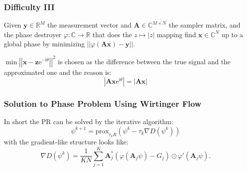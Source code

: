 \begin{frame}
    \frametitle{Difficulty III}
    \begin{Pro}
        Given $\boldsymbol{y} \in \mathbb{R}^M$ the measurement vector and $\boldsymbol{A} \in \mathbb{C}^{M \times N}$ the sampler matrix, 
        and the phase destroyer $\varphi \colon \mathbb{C} \to \mathbb{R}$ that does the
         $z \mapsto \left|z\right|$ mapping find $\boldsymbol{x} \in \mathbb{C}^N$ up to a global phase 
        by minimizing $ \left|\left|\varphi(\boldsymbol{A}\boldsymbol{x})-\boldsymbol{y}\right|\right|$.
      \end{Pro}
    \pause
    \begin{Rem} 
        $\min \left|\left|\boldsymbol{x}-\boldsymbol{z}\mathrm{e}^{-\mathrm{i}\theta}\right|\right|^2$ is chosen as the difference between the 
        true signal and the approximated one and the reason is:
        \begin{equation}
          \left|\boldsymbol{A}\boldsymbol{x}\mathrm{e}^{\mathrm{i}\theta}\right| = \left|\boldsymbol{A}\boldsymbol{x}\right|
        \end{equation}
      \end{Rem}

\end{frame}



\begin{frame}
    \frametitle{Solution to Phase Problem Using Wirtinger Flow}
    \pause
    In short the \acl*{PR} can be solved by the iterative algorithm:
    \pause
      \begin{equation}\label{eq:pr_solution}
        \psi^{k+1} = \text{prox}_{\tau_{k}R}(\psi^k-\tau_k\nabla{D(\psi^k)})
      \end{equation}
\pause
      with the gradient-like structure looks like: 
      \begin{equation}\label{eq:gradient_pr_solution}
        \nabla{D(\psi^k)} = \frac{1}{KN} \sum_{j=1}^{K} \boldsymbol{A}_j^*\left(\varphi\left(\boldsymbol{A}_j\psi\right)-G_j\right)\odot \varphi'(\boldsymbol{A}_j\psi).
      \end{equation}

\end{frame}



